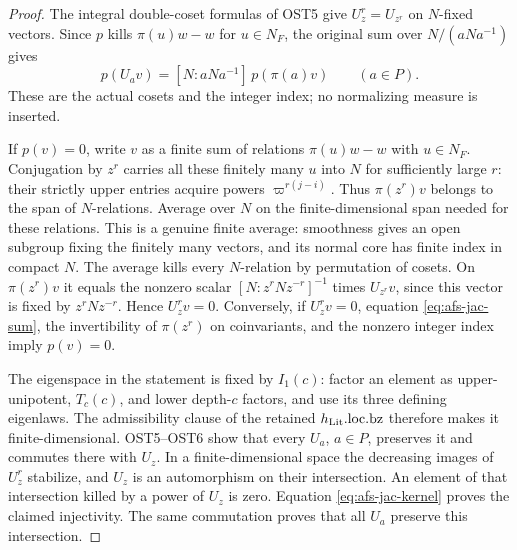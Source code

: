 \documentclass[11pt,a4paper]{article}
\numberwithin{equation}{section}
\theoremstyle{remark}\newtheorem{remark}[theorem]{Remark}
\begin{document}
\begin{proof}
The integral double-coset formulas of OST5 give
$U_z^r=U_{z^r}$ on $N$-fixed vectors.  Since $p$ kills
$\pi(u)w-w$ for $u\in N_F$, the original sum over
$N/(aNa^{-1})$ gives
\begin{equation}\label{eq:afs-jac-sum}
 p(U_av)=[N:aNa^{-1}]\,p(\pi(a)v)\qquad(a\in P).
\end{equation}
These are the actual cosets and the integer index; no
normalizing measure is inserted.

If $p(v)=0$, write $v$ as a finite sum of relations
$\pi(u)w-w$ with $u\in N_F$.  Conjugation by $z^r$ carries
all these finitely many $u$ into $N$ for sufficiently large
$r$: their strictly upper entries acquire powers
$\varpi^{r(j-i)}$.  Thus $\pi(z^r)v$ belongs to the span of
$N$-relations.  Average over $N$ on the finite-dimensional
span needed for these relations.  This is a genuine finite
average: smoothness gives an open subgroup fixing the
finitely many vectors, and its normal core has finite index
in compact $N$.  The average kills every $N$-relation by
permutation of cosets.  On $\pi(z^r)v$ it equals the
nonzero scalar $[N:z^rNz^{-r}]^{-1}$ times $U_{z^r}v$,
since this vector is fixed by $z^rNz^{-r}$.  Hence
$U_z^rv=0$.  Conversely, if $U_z^rv=0$, equation
\eqref{eq:afs-jac-sum}, the invertibility of $\pi(z^r)$ on
coinvariants, and the nonzero integer index imply $p(v)=0$.

The eigenspace in the statement is fixed by $I_1(c)$:
factor an element as upper-unipotent, $T_c(c)$, and lower
depth-$c$ factors, and use its three defining eigenlaws.
The admissibility clause of the retained
$h_{\rm Lit}.\mathrm{loc.bz}$ therefore makes it finite-dimensional.
OST5--OST6 show that every $U_a$, $a\in P$, preserves it
and commutes there with $U_z$.  In a finite-dimensional
space the decreasing images of $U_z^r$ stabilize, and $U_z$
is an automorphism on their intersection.  An element of
that intersection killed by a power of $U_z$ is zero.
Equation \eqref{eq:afs-jac-kernel} proves the claimed
injectivity.  The same commutation proves that all $U_a$
preserve this intersection.
\end{proof}

\end{document}
